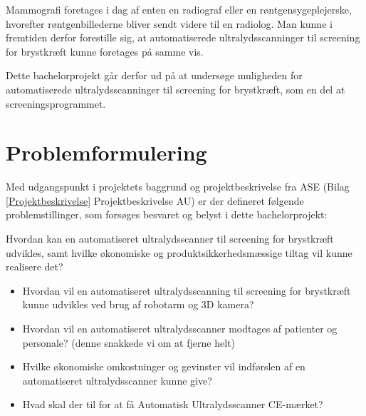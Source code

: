 Mammografi foretages i dag af enten en radiograf eller en røntgensygeplejerske, hvorefter røntgenbillederne bliver sendt videre til en radiolog. Man kunne i fremtiden derfor forestille sig, at automatiserede ultralydsscanninger til screening for brystkræft kunne foretages på samme vis.

Dette bachelorprojekt går derfor ud på at undersøge muligheden for automatiserede ultralydsscanninger til screening for brystkræft, som en del at screeningsprogrammet.

\section{Problemformulering}
Med udgangspunkt i projektets baggrund og projektbeskrivelse fra ASE (Bilag \ref{Projektbeskrivelse} Projektbeskrivelse AU) er der defineret følgende problemstillinger, som forsøges besvaret og belyst i dette bachelorprojekt:

Hvordan kan en automatiseret ultralydsscanner til screening for brystkræft udvikles, samt hvilke økonomiske og produktsikkerhedsmæssige tiltag vil kunne realisere det?

\let\labelitemi\labelitemii
\begin{itemize}
\item Hvordan vil en automatiseret ultralydsscanning til screening for brystkræft kunne udvikles ved brug af robotarm og 3D kamera?
\item Hvordan vil en automatiseret ultralydsscanner modtages af patienter og personale? (denne snakkede vi om at fjerne helt) 
\item Hvilke økonomiske omkostninger og gevinster vil indførslen af en automatiseret ultralydsscanner kunne give? 
\item Hvad skal der til for at få Automatisk Ultralydsscanner CE-mærket? 
\end{itemize}
